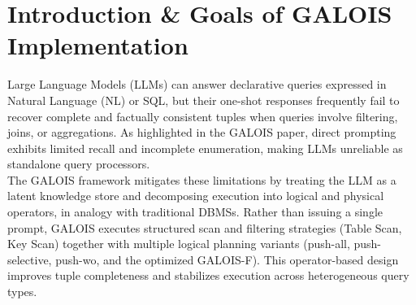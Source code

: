 \section{Introduction \& Goals of GALOIS Implementation}

Large Language Models (LLMs) can answer declarative queries expressed in Natural
Language (NL) or SQL, but their one-shot responses frequently fail to recover complete
and factually consistent tuples when queries involve filtering, joins, or aggregations. As
highlighted in the GALOIS paper, direct prompting exhibits limited recall and incomplete
enumeration, making LLMs unreliable as standalone query processors.
\\
The GALOIS framework mitigates these limitations by treating the LLM as a latent
knowledge store and decomposing execution into logical and physical operators, in
analogy with traditional DBMSs. Rather than issuing a single prompt, GALOIS executes
structured scan and filtering strategies (Table Scan, Key Scan) together with multiple
logical planning variants (push-all, push-selective, push-wo, and the optimized
GALOIS-F). This operator-based design improves tuple completeness and stabilizes
execution across heterogeneous query types.

